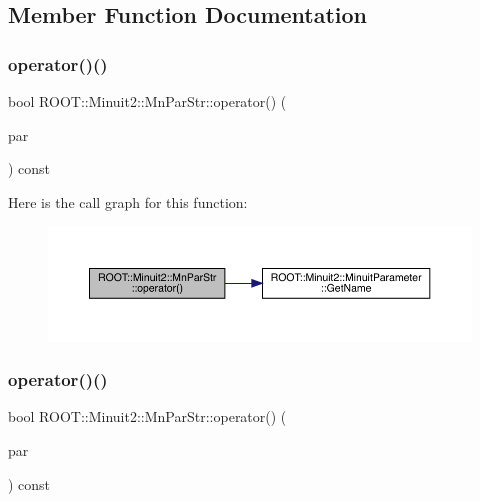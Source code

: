 \subsection{Member Function Documentation}
\mbox{\label{classROOT_1_1Minuit2_1_1MnParStr_a34637805bbe12052e26f2eab37d23ff1}} 
\subsubsection{\texorpdfstring{operator()()}{operator()()}\hspace{0.1cm}{\footnotesize\ttfamily [1/2]}}
{\footnotesize\ttfamily bool R\+O\+O\+T\+::\+Minuit2\+::\+Mn\+Par\+Str\+::operator() (\begin{DoxyParamCaption}\item[{const \mbox{\hyperlink{classROOT_1_1Minuit2_1_1MinuitParameter}{Minuit\+Parameter}} \&}]{par }\end{DoxyParamCaption}) const\hspace{0.3cm}{\ttfamily [inline]}}

Here is the call graph for this function\+:
\nopagebreak
\begin{figure}[H]
\begin{center}
\leavevmode
\includegraphics[width=350pt]{d7/df5/classROOT_1_1Minuit2_1_1MnParStr_a34637805bbe12052e26f2eab37d23ff1_cgraph}
\end{center}
\end{figure}
\mbox{\label{classROOT_1_1Minuit2_1_1MnParStr_a34637805bbe12052e26f2eab37d23ff1}} 
\subsubsection{\texorpdfstring{operator()()}{operator()()}\hspace{0.1cm}{\footnotesize\ttfamily [2/2]}}
{\footnotesize\ttfamily bool R\+O\+O\+T\+::\+Minuit2\+::\+Mn\+Par\+Str\+::operator() (\begin{DoxyParamCaption}\item[{const \mbox{\hyperlink{classROOT_1_1Minuit2_1_1MinuitParameter}{Minuit\+Parameter}} \&}]{par }\end{DoxyParamCaption}) const\hspace{0.3cm}{\ttfamily [inline]}}

